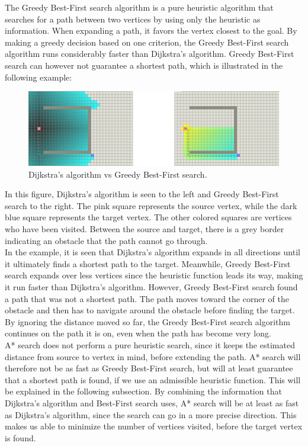 \documentclass[11pt]{article}
\begin{document}
\noindent The Greedy Best-First search algorithm is a pure heuristic algorithm that searches for a path between two vertices by using only the heuristic as information. When expanding a path, it favors the vertex closest to the goal. By making a greedy decision based on one criterion, the Greedy Best-First search algorithm runs considerably faster than Dijkstra's algorithm. Greedy Best-First search can however not guarantee a shortest path, which is illustrated in the following example:

\begin{figure}[H]
\centering
\includegraphics[scale=0.45]{Pictures/Comparison2.png}
\caption[]{Dijkstra's algorithm  vs  Greedy Best-First search.\footnotemark}
\end{figure}

\noindent In this figure, Dijkstra's algorithm is seen to the left and Greedy Best-First search to the right. The pink square represents the source vertex, while the dark blue square represents the target vertex. The other colored squares are vertices who have been visited. Between the source and target, there is a grey border indicating an obstacle that the path cannot go through.\\ 

\noindent In the example, it is seen that Dijkstra's algorithm expands in all directions until it ultimately finds a shortest path to the target. Meanwhile, Greedy Best-First search expands over less vertices since the heuristic function leads its way, making it run faster than Dijkstra's algorithm. However, Greedy Best-First search found a path that was not a shortest path. The path moves toward the corner of the obstacle and then has to navigate around the obstacle before finding the target. By ignoring the distance moved so far, the Greedy Best-First search algorithm continues on the path it is on, even when the path has become very long.\\

\noindent A* search does not perform a pure heuristic search, since it keeps the estimated distance from source to vertex in mind, before extending the path. A* search will therefore not be as fast as Greedy Best-First search, but will at least guarantee that a shortest path is found, if we use an admissible heuristic function. This will be explained in the following subsection. By combining the information that Dijkstra's algorithm and Best-First search uses, A* search will be at least as fast as Dijkstra's algorithm, since the search can go in a more precise direction. This makes us able to minimize the number of vertices visited, before the target vertex is found. \\
\end{document}

